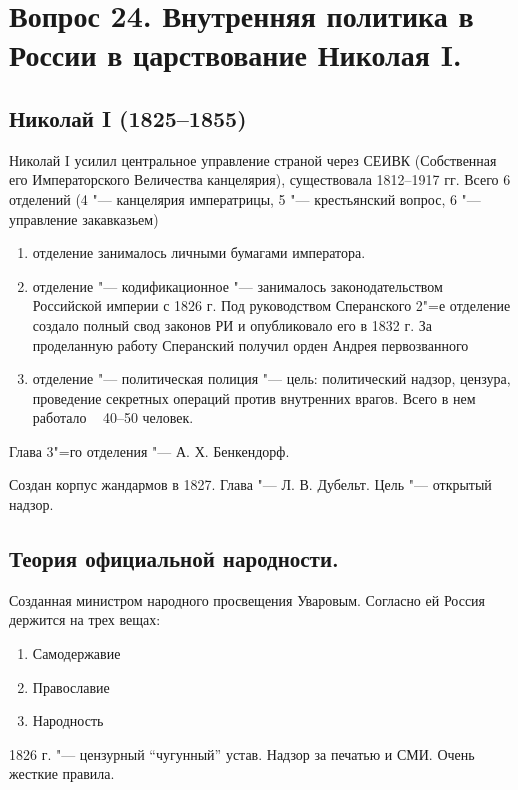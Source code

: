 \section{Вопрос 24. Внутренняя политика в России в царствование Николая I.}

\subsection{Николай I (1825--1855) }

Николай I усилил центральное управление страной через СЕИВК (Собственная его Императорского Величества канцелярия), существовала 1812--1917 гг. Всего 6 отделений (4 "--- канцелярия императрицы, 5 "--- крестьянский вопрос, 6 "--- управление закавказьем)

\begin{enumerate}
    \item{отделение занималось личными бумагами императора. }
    \item{отделение "--- кодификационное "--- занималось законодательством Российской империи с 1826  г. Под руководством Сперанского 2"=е отделение создало полный свод законов РИ и опубликовало его в 1832 г. За проделанную работу Сперанский получил орден Андрея первозванного}
    \item{отделение "--- политическая полиция "--- цель: политический надзор, цензура, проведение секретных операций против внутренних врагов. Всего в нем работало ~ 40--50 человек.}
\end{enumerate}

Глава 3"=го отделения "--- А. Х. Бенкендорф.

 Создан корпус жандармов в 1827. Глава "--- Л. В. Дубельт. Цель "--- открытый надзор.

\subsection{Теория официальной народности.}

Созданная министром народного просвещения Уваровым. Согласно ей Россия держится на трех вещах:

\begin{enumerate}
    \item{Самодержавие}
    \item{Православие}
    \item{Народность}
\end{enumerate}

1826 г. "--- цензурный “чугунный” устав. Надзор за печатью и СМИ. Очень жесткие правила.

